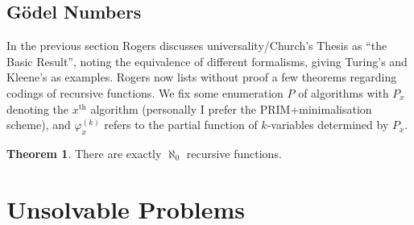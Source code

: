 \documentclass{article}
\newcommand{\aln}{\aleph_0}
\theoremstyle{definition}
\newtheorem{thm}{Theorem}[section]
\begin{document}
\subsection{G\"odel Numbers}
In the previous section Rogers discusses universality/Church's Thesis as ``the Basic Result'', noting the equivalence of different formalisms, giving Turing's and Kleene's as examples. Rogers now lists without proof a few theorems regarding codings of recursive functions. We fix some enumeration $P$ of algorithms with $P_x$ denoting the $x^\text{th}$ algorithm (personally I prefer the PRIM+minimalisation scheme), and $\varphi_x^{(k)}$ refers to the partial function of $k$-variables determined by $P_x$.
\begin{thm}
	There are exactly $\aln$ recursive functions.
\end{thm}

\newpage
\section{Unsolvable Problems}
\end{document}
